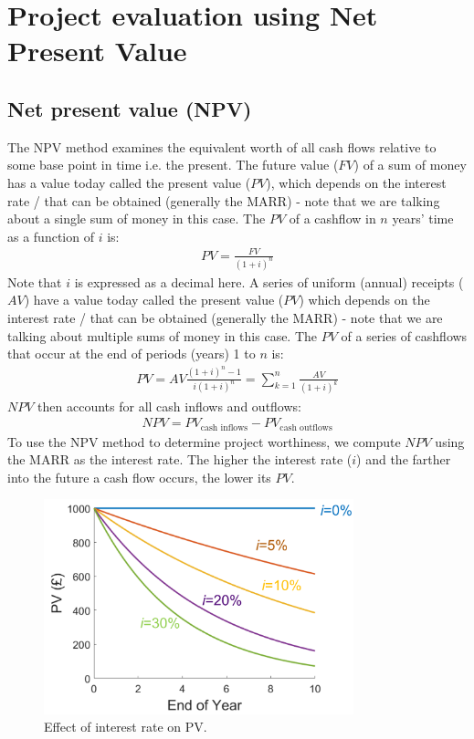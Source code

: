 \documentclass[class=report, crop=false, 12pt,a4paper]{standalone}
\begin{document}
\section{Project evaluation using Net Present Value}
\subsection{Net present value (NPV)}
The NPV method examines the equivalent worth of all cash flows relative to some base point in time i.e. the present. The future value ($FV$) of a sum of money has a value today called the present value ($PV$), which depends on the interest rate / that can be obtained (generally the MARR) - note that we are talking about a single sum of money in this case. The $PV$ of a cashflow in $n$ years' time as a function of $i$ is:
\begin{gather}
	PV = \frac{FV}{\left(1 + i\right)^n}
\end{gather}
Note that $i$ is expressed as a decimal here. A series of uniform (annual) receipts ($AV$) have a value today called the present value ($PV$) which depends on the interest rate / that can be obtained (generally the MARR) - note that we are talking about multiple sums of money in this case. The $PV$ of a series of cashflows that occur at the end of periods (years) 1 to $n$ is:
\begin{gather}
	PV = AV \frac{\left(1+i\right)^n -1}{i\left(1+i\right)^n} = \sum^n_{k=1}\frac{AV}{\left(1+i\right)^k}
\end{gather}
$NPV$ then accounts for all cash inflows and outflows:
\begin{gather}
	NPV = PV_{\textrm{cash inflows}} - PV_{\textrm{cash  outflows}}
\end{gather}
To use the NPV method to determine project worthiness, we compute $NPV$ using the MARR as the interest rate. The higher the interest rate ($i$) and the farther into the future a cash flow occurs, the lower its $PV$.
\begin{figure}[H]
	\centering
	\includegraphics[width = 0.8\textwidth]{../img/figure22.png}
	\caption{Effect of interest rate on PV.}
\end{figure}
\end{document}

